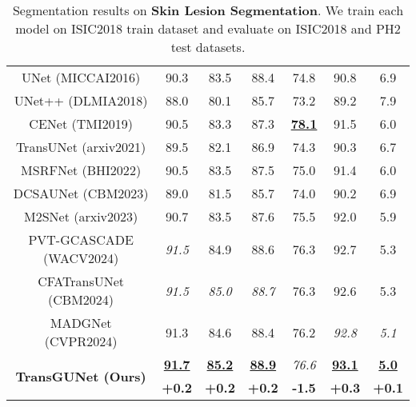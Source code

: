 \begin{table}[h]
\begin{tabular}{c|cccccc}
     \hline
     UNet \tiny{(MICCAI2016)}       & 90.3 & 83.5 & 88.4 & 74.8 & 90.8 & 6.9 \\
     UNet++ \tiny{(DLMIA2018)}      & 88.0 & 80.1 & 85.7 & 73.2 & 89.2 & 7.9 \\
     CENet \tiny{(TMI2019)}         & 90.5 & 83.3 & 87.3 & \textbf{\underline{78.1}} & 91.5 & 6.0 \\
     TransUNet \tiny{(arxiv2021)}   & 89.5 & 82.1 & 86.9 & 74.3 & 90.3 & 6.7 \\
     MSRFNet \tiny{(BHI2022)}       & 90.5 & 83.5 & 87.5 & 75.0 & 91.4 & 6.0 \\
     DCSAUNet \tiny{(CBM2023)}      & 89.0 & 81.5 & 85.7 & 74.0 & 90.2 & 6.9 \\
     M2SNet \tiny{(arxiv2023)}      & 90.7 & 83.5 & 87.6 & 75.5 & 92.0 & 5.9 \\
     PVT-GCASCADE \tiny{(WACV2024)} & \textit{91.5} & 84.9 & 88.6 & 76.3 & 92.7 & 5.3 \\
     CFATransUNet \tiny{(CBM2024)}  & \textit{91.5} & \textit{85.0} & \textit{88.7} & 76.3 & 92.6 & 5.3 \\
     MADGNet \tiny{(CVPR2024)}      & 91.3 & 84.6 & 88.4 & 76.2 & \textit{92.8} & \textit{5.1} \\
     \hline
     \multicolumn{1}{c|}{\multirow{2}{*}{\textbf{TransGUNet \tiny{(Ours)}}}}     & \textbf{\underline{91.7}} & \textbf{\underline{85.2}} & \textbf{\underline{88.9}} & \textit{76.6} & \textbf{\underline{93.1}} & \textbf{\underline{5.0}} \\ \cline{2-7}
     & \textbf{+0.2} & \textbf{+0.2} & \textbf{+0.2} & \textbf{-1.5} & \textbf{+0.3} & \textbf{+0.1} \\
    \hline
    \end{tabular}
    \caption{Segmentation results on \textbf{Skin Lesion Segmentation}. We train each model on ISIC2018 \cite{gutman2016skin} train dataset and evaluate on ISIC2018 \cite{gutman2016skin} and PH2 \cite{mendoncca2013ph} test datasets.}
    \label{tab:comparison_sota_dermatoscopy_other_metrics}
\end{table}


